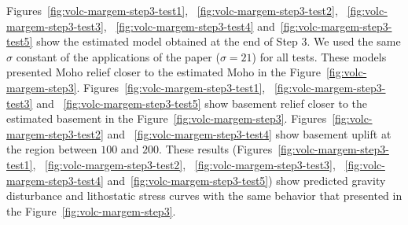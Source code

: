 \documentclass[manuscript]{geophysics}
\begin{document}
Figures~\ref{fig:volc-margem-step3-test1}, ~\ref{fig:volc-margem-step3-test2}, ~\ref{fig:volc-margem-step3-test3}, ~\ref{fig:volc-margem-step3-test4} and~\ref{fig:volc-margem-step3-test5} show the estimated model obtained at the end of Step 3. We used the same $\sigma$ constant of the applications of the paper ($\sigma = 21$) for all tests. These models presented Moho relief closer to the estimated Moho in the Figure~\ref{fig:volc-margem-step3}. Figures~\ref{fig:volc-margem-step3-test1}, ~\ref{fig:volc-margem-step3-test3} and ~\ref{fig:volc-margem-step3-test5} show basement relief closer to the estimated basement in the Figure~\ref{fig:volc-margem-step3}. Figures~\ref{fig:volc-margem-step3-test2} and ~\ref{fig:volc-margem-step3-test4} show basement uplift at the region between $100$ and $200$. These results (Figures~\ref{fig:volc-margem-step3-test1}, ~\ref{fig:volc-margem-step3-test2}, ~\ref{fig:volc-margem-step3-test3}, ~\ref{fig:volc-margem-step3-test4} and~\ref{fig:volc-margem-step3-test5}) show predicted gravity disturbance and lithostatic stress curves with the same behavior that presented in the Figure~\ref{fig:volc-margem-step3}. 



\end{document}
